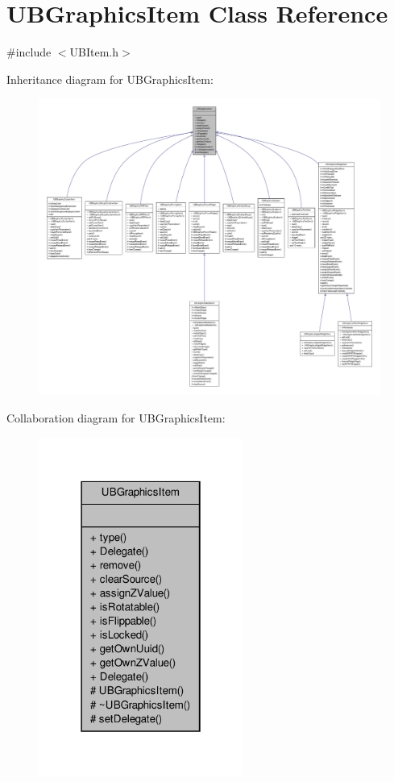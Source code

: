 \hypertarget{class_u_b_graphics_item}{\section{U\-B\-Graphics\-Item Class Reference}
\label{d3/dbd/class_u_b_graphics_item}
}


{\ttfamily \#include $<$U\-B\-Item.\-h$>$}



Inheritance diagram for U\-B\-Graphics\-Item\-:
\nopagebreak
\begin{figure}[H]
\begin{center}
\leavevmode
\includegraphics[width=350pt]{da/d77/class_u_b_graphics_item__inherit__graph}
\end{center}
\end{figure}


Collaboration diagram for U\-B\-Graphics\-Item\-:
\nopagebreak
\begin{figure}[H]
\begin{center}
\leavevmode
\includegraphics[width=190pt]{d6/db3/class_u_b_graphics_item__coll__graph}
\end{center}
\end{figure}
